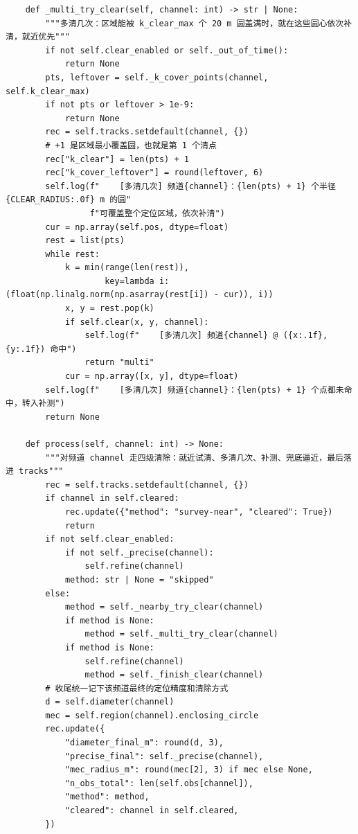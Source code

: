 \documentclass[UTF8, zihao=5,AutoFakeBold=2]{ctexart}
\begin{document}
\begin{lstlisting}
    def _multi_try_clear(self, channel: int) -> str | None:
        """多清几次：区域能被 k_clear_max 个 20 m 圆盖满时，就在这些圆心依次补清，就近优先"""
        if not self.clear_enabled or self._out_of_time():
            return None
        pts, leftover = self._k_cover_points(channel, self.k_clear_max)
        if not pts or leftover > 1e-9:
            return None
        rec = self.tracks.setdefault(channel, {})
        # +1 是区域最小覆盖圆，也就是第 1 个清点
        rec["k_clear"] = len(pts) + 1
        rec["k_cover_leftover"] = round(leftover, 6)
        self.log(f"    [多清几次] 频道{channel}：{len(pts) + 1} 个半径 {CLEAR_RADIUS:.0f} m 的圆"
                 f"可覆盖整个定位区域，依次补清")
        cur = np.array(self.pos, dtype=float)
        rest = list(pts)
        while rest:
            k = min(range(len(rest)),
                    key=lambda i: (float(np.linalg.norm(np.asarray(rest[i]) - cur)), i))
            x, y = rest.pop(k)
            if self.clear(x, y, channel):
                self.log(f"    [多清几次] 频道{channel} @ ({x:.1f}, {y:.1f}) 命中")
                return "multi"
            cur = np.array([x, y], dtype=float)
        self.log(f"    [多清几次] 频道{channel}：{len(pts) + 1} 个点都未命中，转入补测")
        return None

    def process(self, channel: int) -> None:
        """对频道 channel 走四级清除：就近试清、多清几次、补测、兜底逼近，最后落进 tracks"""
        rec = self.tracks.setdefault(channel, {})
        if channel in self.cleared:
            rec.update({"method": "survey-near", "cleared": True})
            return
        if not self.clear_enabled:
            if not self._precise(channel):
                self.refine(channel)
            method: str | None = "skipped"
        else:
            method = self._nearby_try_clear(channel)
            if method is None:
                method = self._multi_try_clear(channel)
            if method is None:
                self.refine(channel)
                method = self._finish_clear(channel)
        # 收尾统一记下该频道最终的定位精度和清除方式
        d = self.diameter(channel)
        mec = self.region(channel).enclosing_circle
        rec.update({
            "diameter_final_m": round(d, 3),
            "precise_final": self._precise(channel),
            "mec_radius_m": round(mec[2], 3) if mec else None,
            "n_obs_total": len(self.obs[channel]),
            "method": method,
            "cleared": channel in self.cleared,
        })


\end{lstlisting}
\end{document}
